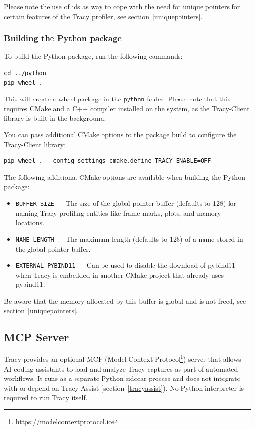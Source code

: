 \documentclass[hidelinks,titlepage,a4paper,twoside]{article}
\begin{document}
Please note the use of ids as way to cope with the need for unique pointers for certain features of the Tracy profiler, see section~\ref{uniquepointers}.

\subsubsection{Building the Python package}

To build the Python package, run the following commands:

\begin{lstlisting}
cd ../python
pip wheel .
\end{lstlisting}

This will create a wheel package in the \texttt{python} folder.
Please note that this requires CMake and a C++ compiler installed on the system, as the Tracy-Client library is built in the background.

You can pass additional CMake options to the package build to configure the Tracy-Client library:
\begin{lstlisting}
pip wheel . --config-settings cmake.define.TRACY_ENABLE=OFF
\end{lstlisting}

The following additional CMake options are available when building the Python package:

\begin{itemize}
\item \texttt{BUFFER\_SIZE} --- The size of the global pointer buffer (defaults to 128) for naming Tracy profiling entities like frame marks, plots, and memory locations.
\item \texttt{NAME\_LENGTH} --- The maximum length (defaults to 128) of a name stored in the global pointer buffer.
\item \texttt{EXTERNAL\_PYBIND11} --- Can be used to disable the download of pybind11 when Tracy is embedded in another CMake project that already uses pybind11.
\end{itemize}

Be aware that the memory allocated by this buffer is global and is not freed, see section~\ref{uniquepointers}.

\subsection{MCP Server}
\label{mcpserver}

Tracy provides an optional MCP (Model Context Protocol\footnote{\url{https://modelcontextprotocol.io}}) server that allows AI coding assistants to load and analyze Tracy captures as part of automated workflows. It runs as a separate Python sidecar process and does not integrate with or depend on Tracy Assist (section~\ref{tracyassist}). No Python interpreter is required to run Tracy itself.
\end{document}
